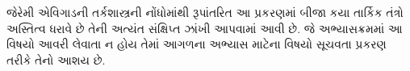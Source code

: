 \documentclass[../../../include/open-logic-chapter]{subfiles}
\begin{document}

\begin{editorial}
  જેરેમી એવિગાડની તર્કશાસ્ત્રની નોંધોમાંથી રૂપાંતરિત આ પ્રકરણમાં બીજા
  કયા તાર્કિક તંત્રો અસ્તિત્વ ધરાવે છે તેની અત્યંત સંક્ષિપ્ત ઝાંખી
  આપવામાં આવી છે. જે અભ્યાસક્રમમાં આ વિષયો આવરી લેવાતા ન હોય તેમાં
  આગળના અભ્યાસ માટેના વિષયો સૂચવતા પ્રકરણ તરીકે તેનો આશય છે.
\end{editorial}








\OLEndChapterHook
\end{document}
